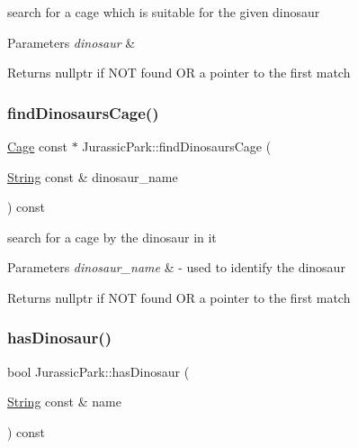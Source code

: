 search for a cage which is suitable for the given dinosaur 
\begin{DoxyParams}{Parameters}
{\em dinosaur} & \\
\hline
\end{DoxyParams}
\begin{DoxyReturn}{Returns}
nullptr if N\+OT found OR a pointer to the first match 
\end{DoxyReturn}
\mbox{\label{classJurassicPark_a73388ce7377a823a73ce912a342c89b6}} 
\subsubsection{\texorpdfstring{find\+Dinosaurs\+Cage()}{findDinosaursCage()}}
{\footnotesize\ttfamily \hyperlink{classCage}{Cage} const  $\ast$ Jurassic\+Park\+::find\+Dinosaurs\+Cage (\begin{DoxyParamCaption}\item[{\hyperlink{classString}{String} const \&}]{dinosaur\+\_\+name }\end{DoxyParamCaption}) const\hspace{0.3cm}{\ttfamily [private]}}

search for a cage by the dinosaur in it 
\begin{DoxyParams}{Parameters}
{\em dinosaur\+\_\+name} & -\/ used to identify the dinosaur \\
\hline
\end{DoxyParams}
\begin{DoxyReturn}{Returns}
nullptr if N\+OT found OR a pointer to the first match 
\end{DoxyReturn}
\mbox{\label{classJurassicPark_a6f5d45e9f908589e8946d6a0395cc06a}} 
\subsubsection{\texorpdfstring{has\+Dinosaur()}{hasDinosaur()}}
{\footnotesize\ttfamily bool Jurassic\+Park\+::has\+Dinosaur (\begin{DoxyParamCaption}\item[{\hyperlink{classString}{String} const \&}]{name }\end{DoxyParamCaption}) const}

